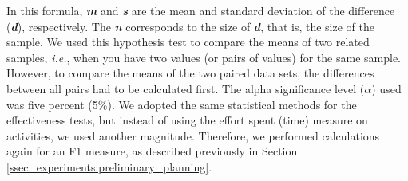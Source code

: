 In this formula, \textit{\textbf{m}} and \textit{\textbf{s}} are the mean and standard deviation of the difference (\textbf{\textit{d}}), respectively.
The \textit{\textbf{n}} corresponds to the size of \textit{\textbf{d}}, that is, the size of the sample.
We used this hypothesis test to compare the means of two related samples, \textit{i.e.}, when you have two values (or pairs of values) for the same sample.
However, to compare the means of the two paired data sets, the differences between all pairs had to be calculated first.
The alpha significance level ($\alpha$) used was five percent (5\%).
We adopted the same statistical methods for the effectiveness tests, but instead of using the effort spent (time) measure on activities, we used another magnitude.
Therefore, we performed calculations again for an F1 measure, as described previously in Section \ref{ssec_experiments:preliminary_planning}.


